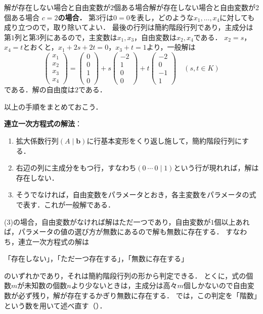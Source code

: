 \begin{example}{解が存在しない場合と自由変数が$2$個ある場合}{解が存在しない場合と自由変数が2個ある場合}
  \textbf{$c = 2$の場合．}
  第$3$行は$0 = 0$を表し，どのような$x_1, \dots, x_4$に対しても成り立つので，取り除いてよい．
  最後の行列は簡約階段行列であり，主成分は第$1$列と第$3$列にあるので，主変数は$x_1,x_3$，自由変数は$x_2,x_4$である．
  $x_2 = s$，$x_4 = t$とおくと，$x_1 + 2s + 2t = 0$，$x_3 + t = 1$より，一般解は
  \[
    \begin{pmatrix} x_1 \\ x_2 \\ x_3 \\ x_4 \end{pmatrix}
    = \begin{pmatrix} 0 \\ 0 \\ 1 \\ 0 \end{pmatrix}
    + s \begin{pmatrix} -2 \\ 1 \\ 0 \\ 0 \end{pmatrix}
    + t \begin{pmatrix} -2 \\ 0 \\ -1 \\ 1 \end{pmatrix}
    \quad (s, t \in K)
  \]
  である．解の自由度は$2$である．
\end{example}

以上の手順をまとめておこう．

\begin{tcolorbox}[colback=white, colframe=black, boxrule=0.5pt, arc=0pt, left=2mm, right=2mm, top=1mm, bottom=1mm]
  \textbf{連立一次方程式の解法}：
  \begin{enumerate}[label=(\arabic*),leftmargin=2.4em]
    \item 拡大係数行列$(A \mid \bm{b})$に行基本変形をくり返し施して，簡約階段行列にする．
    \item 右辺の列に主成分をもつ行，すなわち$(0~\cdots~0 \mid 1)$という行が現れれば，解は存在しない．
    \item そうでなければ，自由変数をパラメータとおき，各主変数をパラメータの式で表す．これが一般解である．
  \end{enumerate}
\end{tcolorbox}

(3)の場合，自由変数がなければ解はただ一つであり，自由変数が$1$個以上あれば，パラメータの値の選び方が無数にあるので解も無数に存在する．
すなわち，連立一次方程式の解は
\begin{center}
  「存在しない」，「ただ一つ存在する」，「無数に存在する」
\end{center}
のいずれかであり，それは簡約階段行列の形から判定できる．
とくに，式の個数$m$が未知数の個数$n$より少ないときは，主成分は高々$m$個しかないので自由変数が必ず残り，解が存在するかぎり無数に存在する．
では，この判定を「階数」という数を用いて述べ直す（）．

